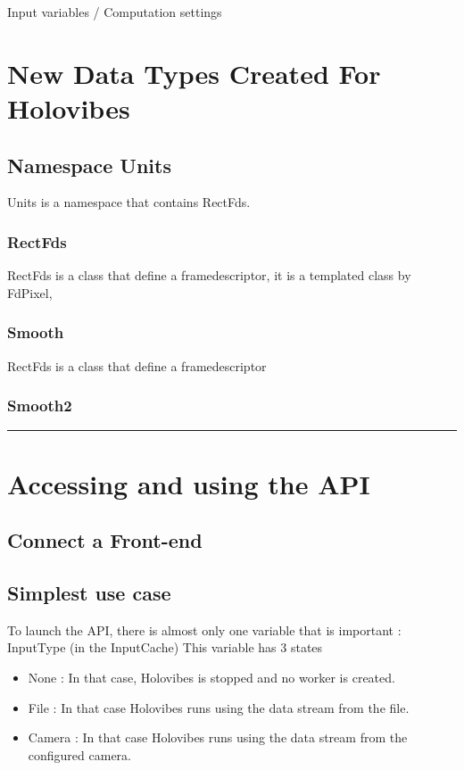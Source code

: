 \documentclass[
 reprint,
 superscriptaddress,
 amsmath,
 amssymb,
 aps,
]{revtex4-2}
\begin{document}
Input variables / Computation settings




%

%




\section{New Data Types Created For Holovibes}
\subsection{Namespace Units}
Units is a namespace that contains RectFds.
\subsubsection{RectFds}
RectFds is a class that define a framedescriptor, it is a templated class by FdPixel, 
\subsubsection{Smooth}
RectFds is a class that define a framedescriptor
\subsubsection{Smooth2}


\onecolumngrid
\hfill
\noindent\rule[0.5ex]{\linewidth}{1pt}

\section{Accessing and using the API}

\subsection{Connect a Front-end}

\subsection{Simplest use case}
To launch the API, there is almost only one variable that is important : InputType (in the InputCache)
This variable has 3 states
\begin{itemize}
    \item None : In that case, Holovibes is stopped and no worker is created.
    \item File : In that case Holovibes runs using the data stream from the file.
    \item Camera : In that case Holovibes runs using the data stream from the configured camera.
\end{itemize}
\end{document}
